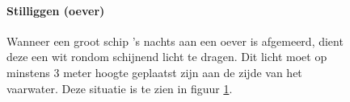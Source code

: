 \begin{figure}[H]
	\centering
	\begin{minipage}[t]{0.75\textwidth}
		\paragraph{Stilliggen (oever)}
		Wanneer een groot schip 's nachts aan een oever is afgemeerd, dient deze een wit rondom schijnend licht te dragen. Dit licht moet op minstens 3 meter hoogte geplaatst zijn aan de zijde van het vaarwater. Deze situatie is te zien in figuur \ref{pic:optisch:groot_stil}.
	\end{minipage}
	\hfill
	\begin{minipage}[t]{0.22\textwidth}
		\RemoveLine
		\caption{}
		\label{pic:optisch:groot_stil}
	\end{minipage}
\end{figure}
\vspace{-0.6cm}
